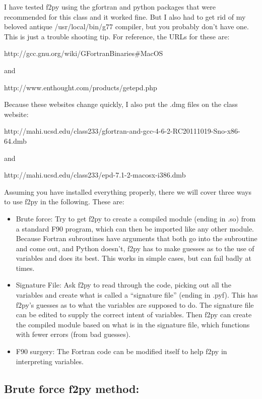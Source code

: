 {I have tested {\color{blue}f2py}   using the gfortran and python packages that were recommended for this class and it worked fine.  But I  also had  to get rid of  my beloved antique /usr/local/bin/g77 compiler, but you probably don't have one.  This is just a trouble shooting tip.  For reference, the URLs for these are:

http://gcc.gnu.org/wiki/GFortranBinaries\#MacOS

\noindent
and 

http://www.enthought.com/products/getepd.php

\noindent Because these websites change quickly, I also put the .dmg files on the class website:

http://mahi.ucsd.edu/class233/gfortran-and-gcc-4-6-2-RC20111019-Sno-x86-64.dmb
\noindent

and

http://mahi.ucsd.edu/class233/epd-7.1-2-macosx-i386.dmb




Assuming you have installed everything properly, there we will cover three ways to use {\color{blue}f2py} in the following.  These are:


\begin {itemize}
\item Brute force:  Try to get  {\color{blue}f2py} to create a compiled module (ending in .so) from a standard F90 program, which can then be imported like any other module. Because Fortran subroutines have arguments that both go into the subroutine and come out,  and Python doesn't, {\color{blue}f2py} has to make guesses as to the use of  variables and does its best.  This works in simple cases, but can fail badly at times. 
\item Signature File:  Ask {\color{blue}f2py} to read through the code, picking out all the variables and create what is called a ``signature file'' (ending in .pyf).  This has {\color{blue}f2py}'s guesses as to what the variables are supposed to do.  The signature file  can be edited to supply the correct intent of variables. Then {\color{blue}f2py} can create the compiled module based on what is in the signature file, which functions with fewer errors (from bad guesses).  
\item F90 surgery:  The Fortran code can be modified itself to help {\color{blue}f2py} in interpreting variables.
\end{itemize}


\subsection{Brute force {\color{blue}f2py} method:}

}
